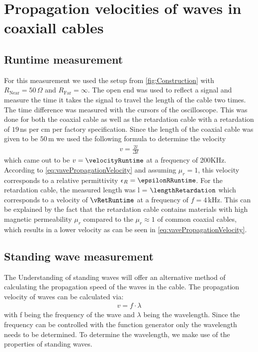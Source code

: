 \documentclass[a4paper,10pt,twocolumn]{article}
\begin{document}
    \section{Propagation velocities of waves in coaxiall cables}
    \subsection{Runtime measurement}
    \label{subsec:runtimeMeasurement}
    For this measurement we used the setup from \autoref{fig:Construction} with $R_{\text{Near}}=50\,\Omega$ and $R_{\text{Far}}=\infty$.
    The open end was used to reflect a signal and measure the time it takes the signal to travel the length of the cable two times.
    The time difference was measured with the cursors of the oscilloscope.
    This was done for both the coaxial cable as well as the retardation cable with a retardation of $19\,$ns per cm per factory specification.
    Since the length of the coaxial cable was given to be $50\,$m we used the following formula to determine the velocity
    \begin{align}
        \label{eq:runtimeVelocity}
        v=\frac{2l}{\Delta t}
        \end{align}
    which came out to be $v = \velocityRuntime$ at a frequency of 200KHz.
    According to \autoref{eq:vavePropagationVelocity} and assuming $\mu_r = 1$, this velocity corresponds to a relative permittivity $\epsilon_R = \epsilonRRuntime$.
    \endline
    For the retardation cable, the measured length was l = $\lengthRetardation$ which corresponds to a velocity of $\vRetRuntime$ at a frequency of $f = 4\,$kHz.
    This can be explained by the fact that the retardation cable contains materials with high magnetic permeability $\mu_r$ compared to the $\mu_r \approx 1 $ of common coaxial cables, which results in a lower velocity as can be seen in \autoref{eq:vavePropagationVelocity}.
    \subsection{Standing wave measurement}
    \label{subsec:standingWaveMeasurement}
    The Understanding of standing waves will offer an alternative method of  calculating the propagation speed of the waves in the cable.
    The propagation velocity of waves can be calculated via:
    \begin{align}
        \label{eq:velocityStanding}
        v = f\cdot\lambda
        \end{align}
    with f being the frequency of the wave and $\lambda$ being the wavelength.
    Since the frequency can be controlled with the function generator only the wavelength needs to be determined.
    To determine the wavelength, we make use of the properties of standing waves. 
    
\end{document}
